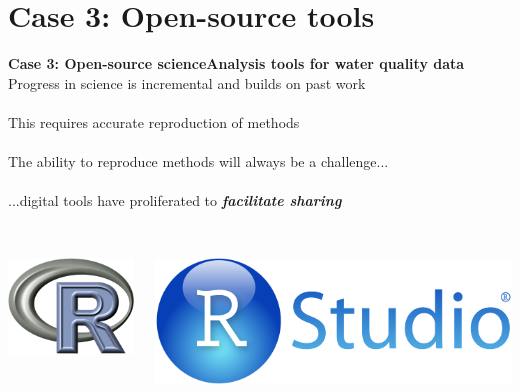 \documentclass[serif]{beamer}\usepackage[]{graphicx}\usepackage[]{color}
\newcommand{\emtxt}[1]{\textbf{\textit{#1}}}
\begin{document}
\section{Case 3: Open-source tools}
\begin{frame}{\textbf{Case 3: Open-source science}}{\textbf{Analysis tools for water quality data}}
\onslide<+->
Progress in science is incremental and builds on past work\\~\\
This requires accurate reproduction of methods\\~\\
The ability to reproduce methods will always be a challenge...\\~\\
\onslide<+->
...digital tools have proliferated to \emtxt{facilitate sharing}\\~\\
\begin{columns}
\begin{column}{0.25\textwidth}
\centerline{\includegraphics[width = \textwidth]{fig/Rlogo.png}}
\end{column}
\begin{column}{0.25\textwidth}
\centerline{\includegraphics[width = \textwidth]{fig/RStudio.png}}

\end{column}
\end{columns}
\end{frame}
\end{document}
